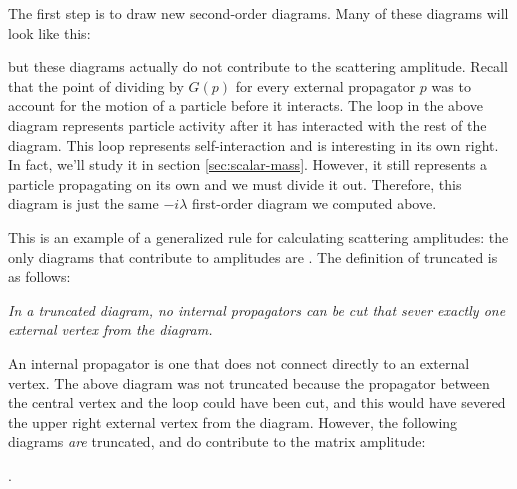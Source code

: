 The first step is to draw new second-order diagrams. Many of these diagrams will look like this:
\begin{center}
\end{center}
but these diagrams actually do not contribute to the scattering amplitude. Recall that the point of dividing by $G(p)$ for every external propagator $p$ was to account for the motion of a particle before it interacts. The loop in the above diagram represents particle activity after it has interacted with the rest of the diagram. This loop represents self-interaction and is interesting in its own right. In fact, we'll study it in section \ref{sec:scalar-mass}. However, it still represents a particle propagating on its own and we must divide it out. Therefore, this diagram is just the same $-i\lambda$ first-order diagram we computed above.

This is an example of a generalized rule for calculating scattering amplitudes: the only diagrams that contribute to amplitudes are . The definition of truncated is as follows:
\begin{center}
  \textit{In a truncated diagram, no internal propagators can be cut that sever exactly one external vertex from the diagram.}
\end{center}
An internal propagator is one that does not connect directly to an external vertex. The above diagram was not truncated because the propagator between the central vertex and the loop could have been cut, and this would have severed the upper right external vertex from the diagram. However, the following diagrams \textit{are} truncated, and do contribute to the matrix amplitude:
\begin{e}
  \qquad
  \qquad
  .
  \label{eqn:scalar-second-order-2-2-diagrams}
\end{e}

